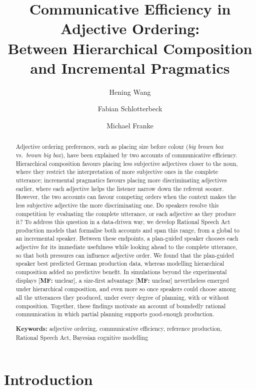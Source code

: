 \documentclass[10pt,a4paper,fleqn]{article}
\title{Communicative Efficiency in Adjective Ordering:\\ Between Hierarchical Composition and Incremental Pragmatics}
\author{Hening Wang}
\author{Fabian Schlotterbeck}
\author{Michael Franke}
\affil{University of T\"ubingen}
\date{}
\newcommand{\mf}[1]{\textcolor{shimmer-main}{[\textbf{MF: }{#1}]}}
\begin{document}
\maketitle

\begin{abstract}
Adjective ordering preferences, such as placing size before colour (\emph{big brown box} vs.~\emph{brown big box}), have been explained by two accounts of communicative efficiency.
Hierarchical composition favours placing less subjective adjectives closer to the noun, where they restrict the interpretation of more subjective ones in the complete utterance; incremental pragmatics favours placing more discriminating adjectives earlier, where each adjective helps the listener narrow down the referent sooner.
However, the two accounts can favour competing orders when the context makes the less subjective adjective the more discriminating one.
Do speakers resolve this competition by evaluating the complete utterance, or each adjective as they produce it?
To address this question in a data-driven way, we develop Rational Speech Act production models that formalise both accounts and span this range, from a global to an incremental speaker.
Between these endpoints, a plan-guided speaker chooses each adjective for its immediate usefulness while looking ahead to the complete utterance, so that both pressures can influence adjective order.
We found that the plan-guided speaker best predicted German production data, whereas modelling hierarchical composition added no predictive benefit.
In simulations beyond the experimental displays \mf{unclear}, a size-first advantage \mf{unclear} nevertheless emerged under hierarchical composition, and even more so once speakers could choose among all the utterances they produced, under every degree of planning, with or without composition.
Together, these findings motivate an account of boundedly rational communication in which partial planning supports good-enough production.

\noindent\textbf{Keywords:} adjective ordering, communicative efficiency, reference production, Rational Speech Act, Bayesian cognitive modelling
\end{abstract}


\section{Introduction}
\label{sec:intro}
\label{sec:background}
\end{document}
